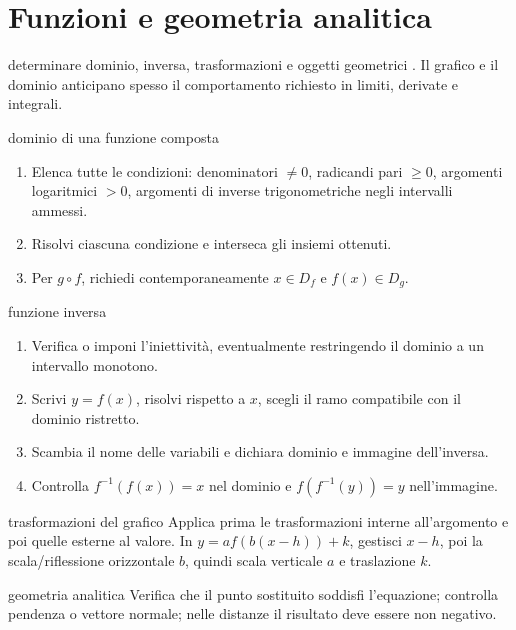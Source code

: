 \chapter{Funzioni e geometria analitica}
\label{chap:3}

\begin{obiettivocapitolo}{determinare dominio, inversa, trasformazioni e oggetti geometrici}
\prioritaalta. Il grafico e il dominio anticipano spesso il comportamento richiesto in limiti, derivate e integrali.
\end{obiettivocapitolo}
\begin{proceduraesame}{dominio di una funzione composta}
\begin{enumerate}
\item Elenca tutte le condizioni: denominatori $\ne0$, radicandi pari $\ge0$, argomenti logaritmici $>0$, argomenti di inverse trigonometriche negli intervalli ammessi.
\item Risolvi ciascuna condizione e interseca gli insiemi ottenuti.
\item Per $g\circ f$, richiedi contemporaneamente $x\in D_f$ e $f(x)\in D_g$.
\end{enumerate}
\end{proceduraesame}
\begin{proceduraesame}{funzione inversa}
\begin{enumerate}
\item Verifica o imponi l'iniettività, eventualmente restringendo il dominio a un intervallo monotono.
\item Scrivi $y=f(x)$, risolvi rispetto a $x$, scegli il ramo compatibile con il dominio ristretto.
\item Scambia il nome delle variabili e dichiara dominio e immagine dell'inversa.
\item Controlla $f^{-1}(f(x))=x$ nel dominio e $f(f^{-1}(y))=y$ nell'immagine.
\end{enumerate}
\end{proceduraesame}
\begin{sceltametodo}{trasformazioni del grafico}
Applica prima le trasformazioni interne all'argomento e poi quelle esterne al valore. In $y=a f(b(x-h))+k$, gestisci $x-h$, poi la scala/riflessione orizzontale $b$, quindi scala verticale $a$ e traslazione $k$.
\end{sceltametodo}
\begin{controllofinale}{geometria analitica}
Verifica che il punto sostituito soddisfi l'equazione; controlla pendenza o vettore normale; nelle distanze il risultato deve essere non negativo.
\end{controllofinale}

